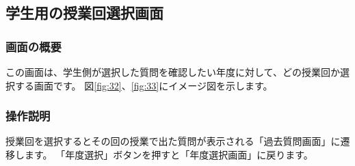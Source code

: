 \newpage

\subsection{学生用の授業回選択画面}
\subsubsection{画面の概要}
この画面は、学生側が選択した質問を確認したい年度に対して、どの授業回か選択する画面です。
図\ref{fig:32}、\ref{fig:33}にイメージ図を示します。

\subsubsection{操作説明}
授業回を選択するとその回の授業で出た質問が表示される「過去質問画面」に遷移します。
「年度選択」ボタンを押すと「年度選択画面」に戻ります。



